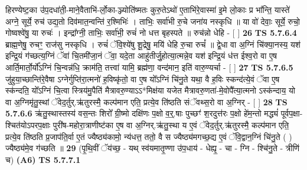 \documentclass[17pt]{extarticle}
\begin{document}
                  हिरण्येष्ट॒का उ॑प॒दधा॑ती॒-माने॒वैताभि॑-र्लो॒का-ञ्ज्योति॑ष्मतः कुरु॒तेऽथो॑ ए॒ताभि॑रे॒वास्मा॑ इ॒मे लो॒काः प्र भा᳚न्ति॒ यास्ते॑ अग्ने॒ सूर्ये॒ रुच॑ उद्य॒तो दिव॑मात॒न्वन्ति॑ र॒श्मिभिः॑ । ताभिः॒ सर्वा॑भी रु॒चे जना॑य नस्कृधि ॥ या वो॑ देवाः॒ सूर्ये॒ रुचो॒ गोष्वश्वे॑षु॒ या रुचः॑ । इन्द्रा᳚ग्नी॒ ताभिः॒ सर्वा॑भी॒ रुचं॑ नो धत्त बृहस्पते ॥ रुच॑न्नो धेहि - [  ] \textbf{  26} \newline
                  \newline
                                \textbf{ TS 5.7.6.4} \newline
                  ब्राह्म॒णेषु॒ रुचꣳ॒॒ राज॑सु नस्कृधि । रुचं॑ ॅवि॒श्ये॑षु शू॒द्रेषु॒ मयि॑ धेहि रु॒चा रुचं᳚ ॥ द्वे॒धा वा अ॒ग्निं चि॑क्या॒नस्य॒ यश॑ इन्द्रि॒यं ग॑च्छत्य॒ग्निं ॅवा॑ चि॒तमी॑जा॒नं ॅवा॒ यदे॒ता आहु॑तीर्जु॒होत्या॒त्मन्ने॒व यश॑ इन्द्रि॒यं ध॑त्त ईश्व॒रो वा ए॒ष आर्ति॒मार्तो॒र्यो᳚ऽग्निं चि॒न्वन्न॑धि॒ क्राम॑ति॒ तत्त्वा॑ यामि॒ ब्रह्म॑णा॒ वन्द॑मान॒ इति॑ वारु॒ण्यर्चा - [  ] \textbf{  27} \newline
                  \newline
                                \textbf{ TS 5.7.6.5} \newline
                  जु॑हुया॒च्छान्ति॑रे॒वैषा ऽग्नेर्गुप्ति॑रा॒त्मनो॑ ह॒विष्कृ॑तो॒ वा ए॒ष यो᳚ऽग्निं चि॑नु॒ते यथा॒ वै ह॒विः स्कन्द॑त्ये॒वं ॅवा ए॒ष स्क॑न्दति॒ यो᳚ऽग्निं चि॒त्वा स्त्रिय॑मु॒पैति॑ मैत्रावरु॒ण्याऽऽ*मिक्ष॑या यजेत मैत्रावरु॒णता॑-मे॒वोपै᳚त्या॒त्मनो ऽस्क॑न्दाय॒ यो वा अ॒ग्निमृ॑तु॒स्थां ॅवेद॒र्तुर्.ऋ॑तुरस्मै॒ कल्प॑मान एति॒ प्रत्ये॒व ति॑ष्ठति संॅवथ्स॒रो वा अ॒ग्निर् - [  ] \textbf{  28} \newline
                  \newline
                                \textbf{ TS 5.7.6.6} \newline
                  ऋ॑तु॒स्थास्तस्य॑ वस॒न्तः शिरो᳚ ग्री॒ष्मो दक्षि॑णः प॒क्षो व॒र्॒.षाः पुच्छꣳ॑ श॒रदुत्त॑रः प॒क्षो हे॑म॒न्तो मद्ध्यं॑ पूर्वप॒क्षा-श्चित॑योऽपरप॒क्षाः पुरी॑ष-महोरा॒त्राणीष्ट॑का ए॒ष वा अ॒ग्निर्.ऋ॑तु॒स्था य ए॒वं ॅवेद॒र्तुर्.ऋ॑तुरस्मै॒ कल्प॑मान एति॒ प्रत्ये॒व ति॑ष्ठति प्र॒जाप॑ति॒र्वा ए॒तं ज्यैष्ठ्य॑कामो॒ न्य॑धत्त॒ ततो॒ वै स ज्यैष्ठ्य॑मगच्छ॒द्य ए॒वं ॅवि॒द्वान॒ग्निं चि॑नु॒ते ( ) ज्यैष्ठ्य॑मे॒व ग॑च्छति ॥ \textbf{  29} \newline
                  \newline
                      (पृ॒थि॒वीं ॅय॑च्छ॒ - यथ् स्व॑यमातृ॒ण्णा उ॑प॒धाय॑ - धेह्यृ॒ - चा - ग्नि - श्चि॑नु॒ते - त्रीणि॑ च)  \textbf{(A6)} \newline \newline
                                        \textbf{ TS 5.7.7.1} \newline
\end{document}
